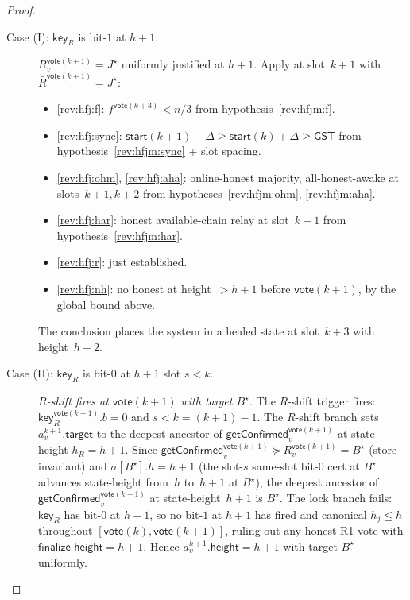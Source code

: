 \documentclass{article}
\newcommand{\target}{\mathsf{target}}
\newcommand{\height}{\mathsf{height}}
\newcommand{\finalizeHeight}{\mathsf{finalize\_height}}
\newcommand{\key}{\mathsf{key}}
\newcommand{\start}{\mathsf{start}}
\newcommand{\vote}{\mathsf{vote}}
\newcommand{\comm}[1]{\bar{#1}}
\newcommand{\getConfirmed}{\textsf{getConfirmed}\xspace}
\theoremstyle{plain}
\theoremstyle{definition}
\theoremstyle{remark}
\newcommand{\GST}{\ensuremath{\mathsf{GST}}}
\newcommand{\OHM}{online-honest majority\xspace}
\newcommand{\HAR}{honest available-chain relay\xspace}
\newcommand{\AHA}{all-honest-awake\xspace}
\begin{document}
\begin{proof}
\begin{description}
\item[{Case (I): $\key_R$ is bit-$1$ at $h+1$.}]\hfill

$R_v^{\vote(k+1)} = J^\star$ uniformly justified at $h+1$. Apply  at slot~$k+1$ with $\comm{R}^{\vote(k+1)} = J^\star$:
\begin{itemize}
  \item \ref{rev:hfj:f}: $f^{\vote(k+3)} < n/3$ from hypothesis~\ref{rev:hfjm:f}.
  \item \ref{rev:hfj:sync}: $\start(k+1) - \Delta \geq \start(k) + \Delta \geq \GST$ from hypothesis~\ref{rev:hfjm:sync} + slot spacing.
  \item \ref{rev:hfj:ohm}, \ref{rev:hfj:aha}: \OHM, \AHA at slots~$k+1, k+2$ from hypotheses~\ref{rev:hfjm:ohm}, \ref{rev:hfjm:aha}.
  \item \ref{rev:hfj:har}: \HAR at slot~$k+1$ from hypothesis~\ref{rev:hfjm:har}.
  \item \ref{rev:hfj:r}: just established.
  \item \ref{rev:hfj:nh}: no honest at height~$> h+1$ before $\vote(k+1)$, by the global bound above.
\end{itemize}
The conclusion places the system in a healed state at slot~$k+3$ with height~$h+2$.

\item[{Case (II): $\key_R$ is bit-$0$ at $h+1$ slot $s < k$.}]\hfill

\emph{$R$-shift fires at $\vote(k+1)$ with target $B^\star$.}
The $R$-shift trigger fires: $\key_R^{\vote(k+1)}.b = 0$ and $s < k = (k+1) - 1$. The $R$-shift branch sets $a^{k+1}_v.\target$ to the deepest ancestor of $\getConfirmed_v^{\vote(k+1)}$ at state-height $h_R = h+1$. Since $\getConfirmed_v^{\vote(k+1)} \succeq R_v^{\vote(k+1)} = B^\star$ (store invariant) and $\sigma[B^\star].h = h+1$ (the slot-$s$ same-slot bit-$0$ cert at $B^\star$ advances state-height from~$h$ to~$h+1$ at $B^\star$), the deepest ancestor of $\getConfirmed_v^{\vote(k+1)}$ at state-height~$h+1$ is $B^\star$. The lock branch fails: $\key_R$ has bit-$0$ at $h+1$, so no bit-$1$ at $h+1$ has fired and canonical $h_j \leq h$ throughout $[\vote(k), \vote(k+1)]$, ruling out any honest R1 vote with $\finalizeHeight = h+1$. Hence $a^{k+1}_v.\height = h+1$ with target $B^\star$ uniformly.


\end{description}
\end{proof}
\end{document}

